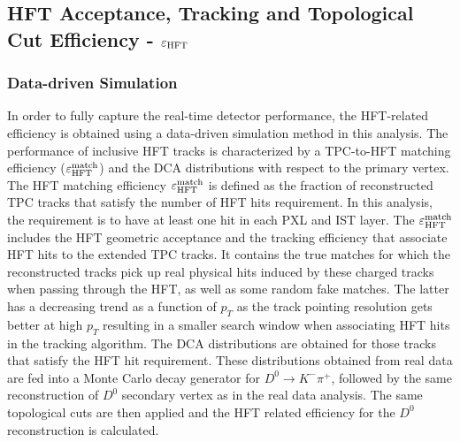 \documentclass[%
 reprint,	
 amsmath,amssymb,
 aps,
 prc,
]{revtex4-1}
\begin{document}
\subsection{HFT Acceptance, Tracking and Topological Cut Efficiency - $\varepsilon_{\rm HFT}$}
\label{correction:hft}

\subsubsection{Data-driven Simulation} 
\label{correction:hft:fastsim}

In order to fully capture the real-time detector performance, the HFT-related efficiency is obtained using a data-driven simulation method in this analysis. The performance of inclusive HFT tracks is characterized by a TPC-to-HFT matching efficiency ($\varepsilon_{\rm HFT}^{\rm match}$) and the DCA distributions with respect to the primary vertex. The HFT matching efficiency $\varepsilon_{\rm HFT}^{\rm match}$ is defined as the fraction of reconstructed TPC tracks that satisfy the number of HFT hits requirement. In this analysis, the requirement is to have at least one hit in each PXL and IST layer. The $\varepsilon_{\rm HFT}^{\rm match}$ includes the HFT geometric acceptance and the tracking efficiency that associate HFT hits to the extended TPC tracks. It contains the true matches for which the reconstructed tracks pick up real physical hits induced by these charged tracks when passing through the HFT, as well as some random fake matches. The latter has a decreasing trend as a function of $p_T$ as the track pointing resolution gets better at high $p_T$ resulting in a smaller search window when associating HFT hits in the tracking algorithm. The DCA distributions are obtained for those tracks that satisfy the HFT hit requirement. These distributions obtained from real data are fed into a Monte Carlo decay generator for $D^0\rightarrow K^-\pi^+$, followed by the same reconstruction of $D^0$ secondary vertex as in the real data analysis. The same topological cuts are then applied and the HFT related efficiency for the $D^0$ reconstruction is calculated.
\end{document}
